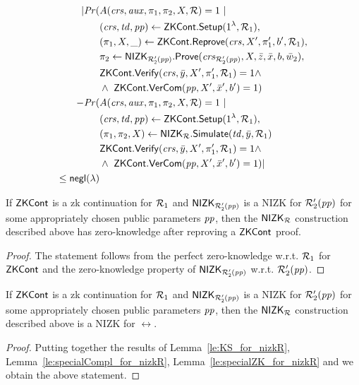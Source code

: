 {\begin{align*}
| \mathit{Pr}(& A(\mathit{crs}, \mathit{aux}, \pi_1,\pi_2, X, \mathcal{R}) = 1 \ | \\ 
                    & (\mathit{crs}, \mathit{td}, \mathit{pp}) \leftarrow {\ensuremath{\mathsf{ZKCont}}}.{\mathsf{Setup}} (1^{\lambda}, \mathcal{R}_1), \\
                  &(\pi_1, X, \_) \leftarrow {\ensuremath{\mathsf{ZKCont}}}.{\mathsf{Reprove}} (\mathit{crs}, X', \pi_1', b', \mathcal{R}_1), \\
                  & \pi_2 \leftarrow {\ensuremath{\mathsf{NIZK_{\mathcal{R}'_2(\mathit{pp})}}}}.{\mathsf{Prove}}(\mathit{crs}_{\mathcal{R}'_2(\mathit{pp})}, X, \bar{z}, \bar{x}, b, \bar{w}_2), \\
                  &  {\mathsf{ZKCont}}.{\mathsf{Verify}}(\mathit{crs}, \bar{y}, X', \pi'_1, \mathcal{R}_1) = 1 \wedge \ \\
                  & \wedge \ {\mathsf{ZKCont}}.{\mathsf{VerCom}}(\mathit{pp}, X', \bar{x}', b') = 1)   \\
- \mathit{Pr}(& A(\mathit{crs}, \mathit{aux}, \pi_1,\pi_2, X, \mathcal{R}) = 1 \ | \\
                     & (\mathit{crs}, \mathit{td}, \mathit{pp}) \leftarrow {\ensuremath{\mathsf{ZKCont}}}.{\mathsf{Setup}} (1^{\lambda}, \mathcal{R}_1), \\ 
                     & (\pi_1,\pi_2, X) \leftarrow {\ensuremath{\mathsf{NIZK_{\mathcal{R}}}}}.{\mathsf{Simulate}}(\mathit{td}, \bar{y}, \mathcal{R}_1) \\ 
                     &  {\mathsf{ZKCont}}.{\mathsf{Verify}}(\mathit{crs}, \bar{y}, X', \pi'_1, \mathcal{R}_1) = 1 \wedge \ \\
                     & \wedge \  {\mathsf{ZKCont}}.{\mathsf{VerCom}}(\mathit{pp}, X', \bar{x}', b') = 1) | \\
                    \leq \mathsf{negl}(\lambda)
\end{align*}}

\begin{lemma} 
\label{le:specialZK_for_nizkR}
If ${\mathsf{ZKCont}}$ is a zk continuation for $\mathcal{R}_1$ and ${\mathsf{NIZK_{\mathcal{R}'_2(\mathit{pp})}}}$ is a NIZK for $\mathcal{R}_2'(\mathit{pp})$ for some appropriately chosen public parameters $\mathit{pp}$, 
then the ${\mathsf{NIZK_{\mathcal{R}}}}$ construction described above has zero-knowledge after reproving a ${\mathsf{ZKCont}}$ proof.
\end{lemma} 
\begin{proof} The statement follows from the perfect zero-knowledge w.r.t. $\mathcal{R}_1$ for ${\mathsf{ZKCont}}$ and 
the zero-knowledge property of ${\mathsf{NIZK_{\mathcal{R}'_2(\mathit{pp})}}}$ w.r.t. $\mathcal{R}_2'(\mathit{pp})$.
\end{proof}
 
\begin{corollary}
If ${\mathsf{ZKCont}}$ is a zk continuation for $\mathcal{R}_1$ and ${\mathsf{NIZK_{\mathcal{R}'_2(\mathit{pp})}}}$ is a NIZK for $\mathcal{R}_2'(\mathit{pp})$ for some appropriately chosen public parameters $\mathit{pp}$, 
then the ${\mathsf{NIZK_{\mathcal{R}}}}$ construction described above is a NIZK for $\rel$.
 \end{corollary}
 
\begin{proof} Putting together the results of Lemma~\ref{le:KS_for_nizkR}, Lemma~\ref{le:specialCompl_for_nizkR}, 
Lemma~\ref{le:specialZK_for_nizkR} and  we obtain the above statement.
\end{proof} 
